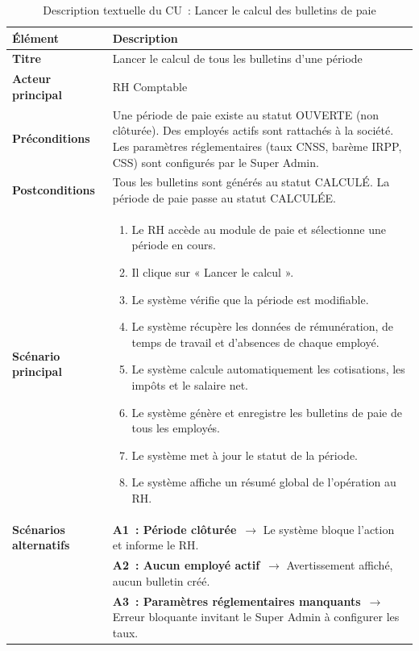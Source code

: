 \begin{xltabular}{\textwidth}{|l|X|}
\hline
{} \textbf{Élément} & \textbf{Description} \\ \hline
\endfirsthead
\hline
\caption{Description textuelle du CU~: Lancer le calcul des bulletins de paie}
\label{tab:cu-calcul} 
\endlastfoot
\textbf{Titre} & Lancer le calcul de tous les bulletins d'une période \\ \hline
\textbf{Acteur principal} & RH Comptable \\ \hline
\textbf{Préconditions} & Une période de paie existe au statut OUVERTE
  (non clôturée). Des employés actifs sont rattachés à la société.
  Les paramètres réglementaires (taux CNSS, barème IRPP, CSS) sont
  configurés par le Super Admin. \\ \hline
\textbf{Postconditions} & Tous les bulletins  sont générés
  au statut CALCULÉ. La période de paie passe au statut
 CALCULÉE. \\ \hline
\textbf{Scénario principal} &
    \begin{enumerate}[nosep, leftmargin=*]
        \item Le RH accède au module de paie et sélectionne une période en cours.
        \item Il clique sur « Lancer le calcul ».
        \item Le système vérifie que la période est modifiable.
        \item Le système récupère les données de rémunération, de temps de travail et d'absences de chaque employé.
        \item Le système calcule automatiquement les cotisations, les impôts et le salaire net.
        \item Le système génère et enregistre les bulletins de paie de tous les employés.
        \item Le système met à jour le statut de la période.
        \item Le système affiche un résumé global de l'opération au RH.
    \end{enumerate} 
 \\\hline
\textbf{Scénarios alternatifs}
& \textbf{A1~: Période clôturée}~$\rightarrow$ Le système bloque l'action et informe le RH. \\ 
& \textbf{A2~: Aucun employé actif}~$\rightarrow$ Avertissement affiché, aucun bulletin créé. \\ 
& \textbf{A3~: Paramètres réglementaires manquants}~$\rightarrow$ Erreur bloquante invitant le Super Admin à configurer les taux. \\
\end{xltabular}

